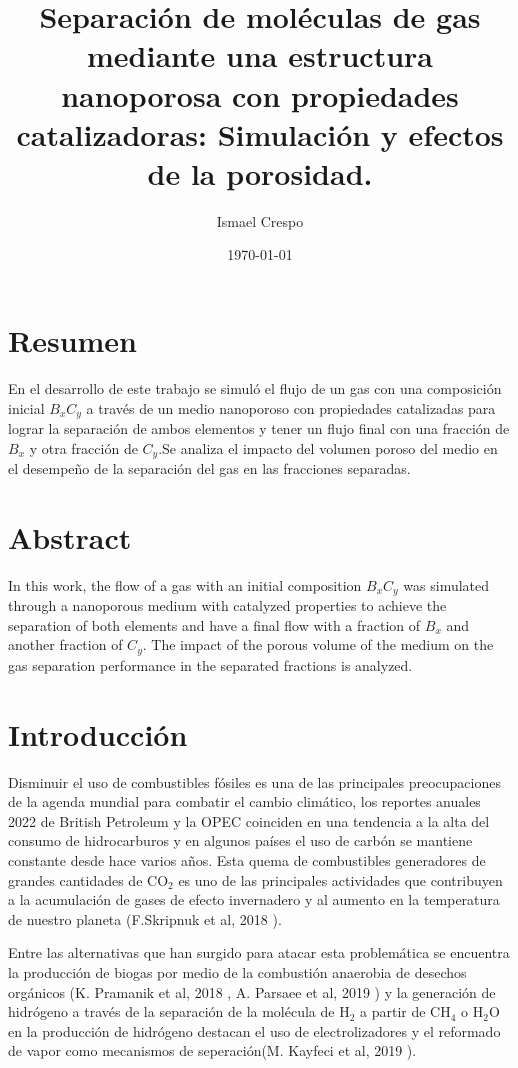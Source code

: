 \documentclass{article}
\title{Separación de moléculas de gas mediante una estructura nanoporosa con propiedades catalizadoras: Simulación y efectos de la porosidad.}
\author{Ismael Crespo}
\date{\today}
\begin{document}
\maketitle

\section*{Resumen}
En el desarrollo de este trabajo se simuló el flujo de un gas con una composición inicial $B_{x}C_{y}$ a través de un medio nanoporoso con propiedades catalizadas para lograr la separación de ambos elementos y tener un flujo final con una fracción  de $B_{x}$ y otra fracción de  $C_{y}$.Se analiza el impacto del volumen poroso del medio en el desempeño de la separación del gas en las fracciones separadas. 
\section*{Abstract}
In this work, the flow of a gas with an initial composition $B_{x}C_{y}$ was simulated through a nanoporous medium with catalyzed properties to achieve the separation of both elements and have a final flow with a fraction of $B_{x}$ and another fraction of $C_{y}$. The impact of the porous volume of the medium on the gas separation performance in the separated fractions is analyzed.

\section{Introducción}
Disminuir el uso de combustibles fósiles es una de las principales preocupaciones de la agenda mundial para combatir el cambio climático, los reportes anuales 2022 de British Petroleum \citep{BP} y la OPEC \citep{opec} coinciden en una tendencia a la alta del consumo de hidrocarburos y en algunos países el uso de carbón se mantiene constante desde hace varios años. Esta quema de combustibles generadores de grandes cantidades de CO$_2$ es uno de las principales actividades que contribuyen a la acumulación de gases de efecto invernadero y al aumento en la temperatura de nuestro planeta (F.Skripnuk et al, 2018 \citep{Skripnuk_2018}). 

Entre las alternativas que han surgido para atacar esta problemática se encuentra la producción de biogas por medio de la combustión anaerobia  de desechos orgánicos (K. Pramanik et al, 2018 \citep{PRAMANIK2019100310}, A. Parsaee et al, 2019 \citep{parsaee2019review}) y la generación de hidrógeno a través de la separación de la molécula de H$_2$ a partir de CH$_{4}$ o H$_{2}$O en la producción de hidrógeno destacan el uso de electrolizadores y el reformado de vapor como mecanismos de seperación(M. Kayfeci et al, 2019 \citep{KAYFECI201945}).
\end{document}
